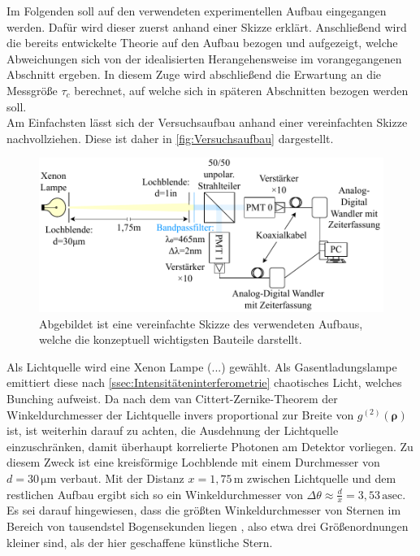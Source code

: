 Im Folgenden soll auf den verwendeten experimentellen Aufbau eingegangen werden. 
Dafür wird dieser zuerst anhand einer Skizze erklärt. 
Anschließend wird die bereits entwickelte Theorie auf den Aufbau bezogen und aufgezeigt, welche Abweichungen sich von der idealisierten Herangehensweise im vorangegangenen Abschnitt ergeben. 
In diesem Zuge wird abschließend die Erwartung an die Messgröße $\tau_c$ berechnet, auf welche sich in späteren Abschnitten bezogen werden soll. \\

Am Einfachsten lässt sich der Versuchsaufbau anhand einer vereinfachten Skizze nachvollziehen. Diese ist daher in \autoref{fig:Versuchsaufbau} dargestellt. 
\begin{figure}[h]
    \centering
    \includegraphics[width=0.9\linewidth]{images/Aufbau/Aufbau.pdf}
    \caption{Abgebildet ist eine vereinfachte Skizze des verwendeten Aufbaus, welche die konzeptuell wichtigsten Bauteile darstellt.}
    \label{fig:Versuchsaufbau}
\end{figure}
Als Lichtquelle wird eine Xenon Lampe (...) gewählt. 
Als Gasentladungslampe emittiert diese nach \autoref{ssec:Intensitäteninterferometrie} chaotisches Licht, welches Bunching aufweist. 
Da nach dem van Cittert-Zernike-Theorem der Winkeldurchmesser der Lichtquelle invers proportional zur Breite von $g^{(2)}(\bm{\rho})$ ist, ist weiterhin darauf zu achten, die Ausdehnung der Lichtquelle einzuschränken, damit überhaupt korrelierte Photonen am Detektor vorliegen. 
Zu diesem Zweck ist eine kreisförmige Lochblende mit einem Durchmesser von $d=30\,\mathrm{\mu m}$ verbaut. 
Mit der Distanz $x=1,75\,\mathrm{m}$ zwischen Lichtquelle und dem restlichen Aufbau ergibt sich so ein Winkeldurchmesser von $\Delta \theta \approx \frac{d}{x} = 3,53\,\mathrm{asec}$. 
Es sei darauf hingewiesen, dass die größten Winkeldurchmesser von Sternen im Bereich von tausendstel Bogensekunden liegen \cite{hanburybrownAngularDiameters321974}, also etwa drei Größenordnungen kleiner sind, als der hier geschaffene \glqq künstliche Stern\grqq. \\
